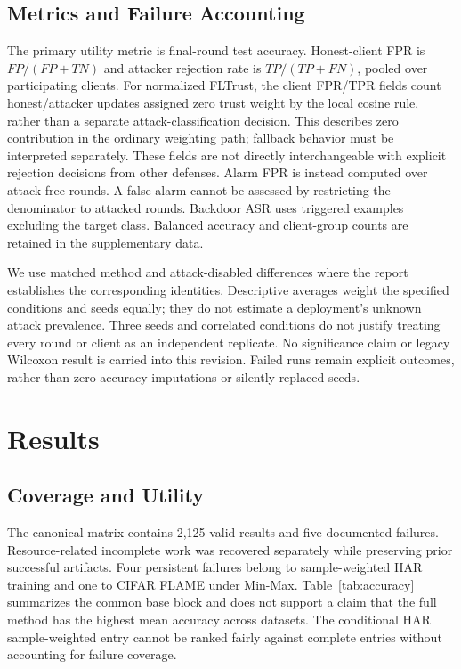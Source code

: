 \documentclass[journal]{IEEEtran}
\begin{document}
\subsection{Metrics and Failure Accounting}
The primary utility metric is final-round test accuracy. Honest-client FPR is $FP/(FP+TN)$ and attacker rejection rate is $TP/(TP+FN)$, pooled over participating clients. For normalized FLTrust, the client FPR/TPR fields count honest/attacker updates assigned zero trust weight by the local cosine rule, rather than a separate attack-classification decision. This describes zero contribution in the ordinary weighting path; fallback behavior must be interpreted separately. These fields are not directly interchangeable with explicit rejection decisions from other defenses. Alarm FPR is instead computed over attack-free rounds. A false alarm cannot be assessed by restricting the denominator to attacked rounds. Backdoor ASR uses triggered examples excluding the target class. Balanced accuracy and client-group counts are retained in the supplementary data.

We use matched method and attack-disabled differences where the report establishes the corresponding identities. Descriptive averages weight the specified conditions and seeds equally; they do not estimate a deployment's unknown attack prevalence. Three seeds and correlated conditions do not justify treating every round or client as an independent replicate. No significance claim or legacy Wilcoxon result is carried into this revision. Failed runs remain explicit outcomes, rather than zero-accuracy imputations or silently replaced seeds.

\section{Results}
\subsection{Coverage and Utility}
The canonical matrix contains 2,125 valid results and five documented failures. Resource-related incomplete work was recovered separately while preserving prior successful artifacts. Four persistent failures belong to sample-weighted HAR training and one to CIFAR FLAME under Min-Max. Table~\ref{tab:accuracy} summarizes the common base block and does not support a claim that the full method has the highest mean accuracy across datasets. The conditional HAR sample-weighted entry cannot be ranked fairly against complete entries without accounting for failure coverage.

\end{document}
